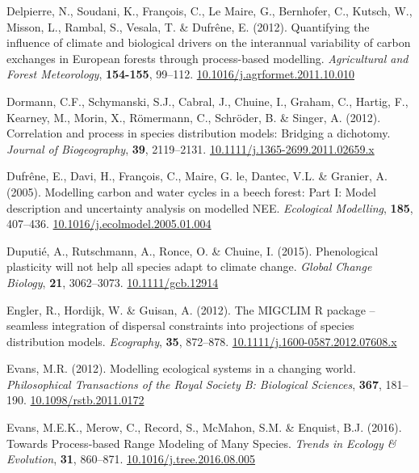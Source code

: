\documentclass[11pt,]{article}
\newlength{\cslhangindent}
\newenvironment{CSLReferences}[2] %
 {%
  \setlength{\parindent}{0pt}
  \ifodd #1 \everypar{\setlength{\hangindent}{\cslhangindent}}\ignorespaces\fi
  \ifnum #2 > 0
  \setlength{\parskip}{#2\baselineskip}
  \fi
 }%
 {}
\begin{document}
\begin{CSLReferences}{1}{0}
\leavevmode{}%
Delpierre, N., Soudani, K., François, C., Le Maire, G., Bernhofer, C.,
Kutsch, W., Misson, L., Rambal, S., Vesala, T. \& Dufrêne, E. (2012).
Quantifying the influence of climate and biological drivers on the
interannual variability of carbon exchanges in {European} forests
through process-based modelling. \emph{Agricultural and Forest
Meteorology}, \textbf{154-155}, 99--112.
\href{https://doi.org/10.1016/j.agrformet.2011.10.010}{10.1016/j.agrformet.2011.10.010}

\leavevmode{}%
Dormann, C.F., Schymanski, S.J., Cabral, J., Chuine, I., Graham, C.,
Hartig, F., Kearney, M., Morin, X., Römermann, C., Schröder, B. \&
Singer, A. (2012). Correlation and process in species distribution
models: Bridging a dichotomy. \emph{Journal of Biogeography},
\textbf{39}, 2119--2131.
\href{https://doi.org/10.1111/j.1365-2699.2011.02659.x}{10.1111/j.1365-2699.2011.02659.x}

\leavevmode{}%
Dufrêne, E., Davi, H., François, C., Maire, G. le, Dantec, V.L. \&
Granier, A. (2005). Modelling carbon and water cycles in a beech forest:
{Part} {I}: {Model} description and uncertainty analysis on modelled
{NEE}. \emph{Ecological Modelling}, \textbf{185}, 407--436.
\href{https://doi.org/10.1016/j.ecolmodel.2005.01.004}{10.1016/j.ecolmodel.2005.01.004}

\leavevmode{}%
Duputié, A., Rutschmann, A., Ronce, O. \& Chuine, I. (2015).
Phenological plasticity will not help all species adapt to climate
change. \emph{Global Change Biology}, \textbf{21}, 3062--3073.
\href{https://doi.org/10.1111/gcb.12914}{10.1111/gcb.12914}

\leavevmode{}%
Engler, R., Hordijk, W. \& Guisan, A. (2012). The {MIGCLIM} {R} package
-- seamless integration of dispersal constraints into projections of
species distribution models. \emph{Ecography}, \textbf{35}, 872--878.
\href{https://doi.org/10.1111/j.1600-0587.2012.07608.x}{10.1111/j.1600-0587.2012.07608.x}

\leavevmode{}%
Evans, M.R. (2012). Modelling ecological systems in a changing world.
\emph{Philosophical Transactions of the Royal Society B: Biological
Sciences}, \textbf{367}, 181--190.
\href{https://doi.org/10.1098/rstb.2011.0172}{10.1098/rstb.2011.0172}

\leavevmode{}%
Evans, M.E.K., Merow, C., Record, S., McMahon, S.M. \& Enquist, B.J.
(2016). Towards {Process}-based {Range} {Modeling} of {Many} {Species}.
\emph{Trends in Ecology \& Evolution}, \textbf{31}, 860--871.
\href{https://doi.org/10.1016/j.tree.2016.08.005}{10.1016/j.tree.2016.08.005}


\end{CSLReferences}
\end{document}
